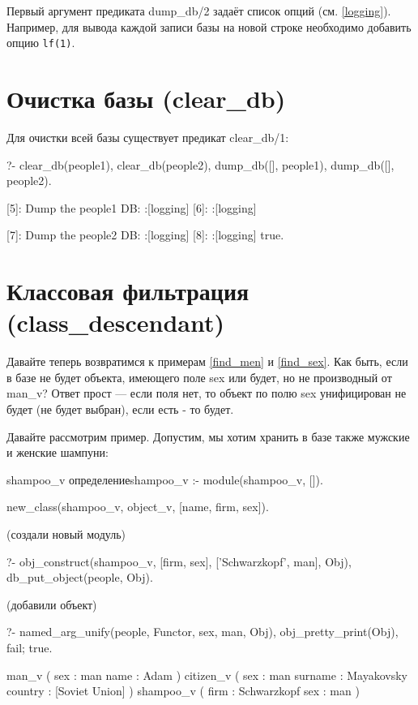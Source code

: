 \documentclass[a4paper]{book}
\begin{document}
Первый аргумент предиката dump\_db/2 задаёт список опций
(см. \ref{logging}). Например, для вывода каждой записи базы на
новой строке необходимо добавить опцию \verb|lf(1)|.

\section{Очистка базы (clear\_db)}
\label{clear_db}

Для очистки всей базы существует предикат clear\_db/1:

\begin{example}{}{}
?- clear_db(people1), clear_db(people2), 
   dump_db([], people1), dump_db([], people2).                                                         

[5]: Dump the people1 DB:  :[logging]
[6]:  :[logging]

[7]: Dump the people2 DB:  :[logging]
[8]:  :[logging]
true.
\end{example}

\section{Классовая фильтрация (class\_descendant)}
\label{class_descendant}

Давайте теперь возвратимся к примерам \ref{find_men} и
\ref{find_sex}. Как быть, если в базе не будет объекта, имеющего
поле sex или будет, но не производный от man\_v? Ответ прост ---
если поля нет, то объект по полю sex унифицирован не будет (не
будет выбран), если есть - то будет.

Давайте рассмотрим пример. Допустим, мы хотим хранить в базе
также мужские и женские шампуни:

\begin{example}{shampoo\_v определение}{shampoo_v}
:- module(shampoo_v, []).

new_class(shampoo_v, object_v, [name, firm, sex]).
\end{example}

(создали новый модуль)

\begin{example}{}{}
?- obj_construct(shampoo_v, [firm, sex], 
                 ['Schwarzkopf', man], Obj),
    db_put_object(people, Obj).
\end{example}

(добавили объект)

\begin{example}{}{}
?- named_arg_unify(people, Functor, sex, man, Obj), 
   obj_pretty_print(Obj), fail; true.

man_v ( 
  sex : man 
  name : Adam 
) 
citizen_v ( 
  sex : man 
  surname : Mayakovsky 
  country : [Soviet Union] 
) 
shampoo_v ( 
  firm : Schwarzkopf 
  sex : man 
) 
\end{example}
\end{document}
